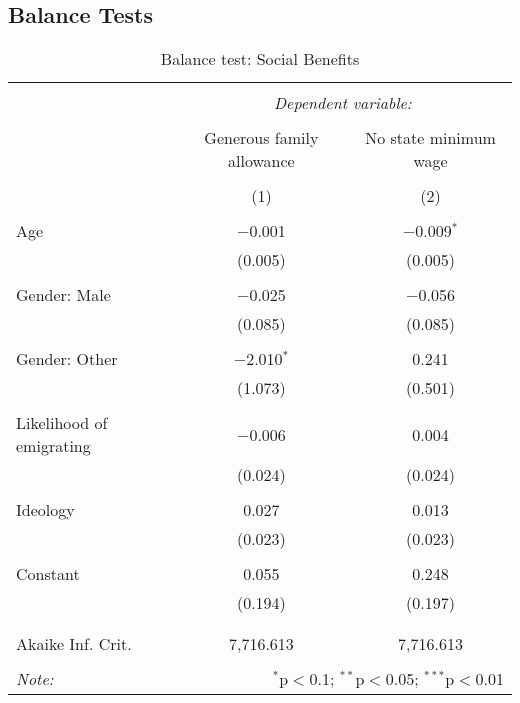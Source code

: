 \documentclass[12pt]{article}
\begin{document}
\begin{appendices}
\section{Balance Tests}
\begin{table}[!htbp] \centering 
  \caption{Balance test: Social Benefits} 
  \label{tab:balance1} 
\begin{tabular}{@{\extracolsep{5pt}}lcc} 
\\[-1.8ex]\hline 
\hline \\[-1.8ex] 
 & \multicolumn{2}{c}{\textit{Dependent variable:}} \\ 
\cline{2-3} 
\\[-1.8ex] & Generous family allowance & No state minimum wage \\ 
\\[-1.8ex] & (1) & (2)\\ 
\hline \\[-1.8ex] 
 Age & $-$0.001 & $-$0.009$^{*}$ \\ 
  & (0.005) & (0.005) \\ 
  & & \\ 
 Gender: Male & $-$0.025 & $-$0.056 \\ 
  & (0.085) & (0.085) \\ 
  & & \\ 
 Gender: Other & $-$2.010$^{*}$ & 0.241 \\ 
  & (1.073) & (0.501) \\ 
  & & \\ 
 Likelihood of emigrating & $-$0.006 & 0.004 \\ 
  & (0.024) & (0.024) \\ 
  & & \\ 
 Ideology & 0.027 & 0.013 \\ 
  & (0.023) & (0.023) \\ 
  & & \\ 
 Constant & 0.055 & 0.248 \\ 
  & (0.194) & (0.197) \\ 
  & & \\ 
\hline \\[-1.8ex] 
Akaike Inf. Crit. & 7,716.613 & 7,716.613 \\  
\hline 
\hline \\[-1.8ex] 
\textit{Note:}  & \multicolumn{2}{r}{$^{*}$p$<$0.1; $^{**}$p$<$0.05; $^{***}$p$<$0.01} \\ 
\end{tabular} 
\end{table} 


\end{appendices}
\end{document}
